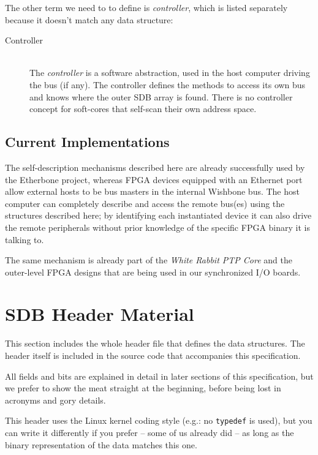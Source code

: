 \documentclass[a4paper, 12pt]{article}
\begin{document}
The other term we need to to define is \textit{controller},
which is listed separately because it doesn't match any data structure:

\begin{description}
\item[Controller] \hfill \\
The \textit{controller} is a software abstraction, used in the host
computer driving the bus (if any). The controller defines the
methods to access its own bus and knows where the outer SDB
array is found.  There is no controller concept for soft-cores
that  self-scan their own address space.

\end{description}

\subsection{Current Implementations}

The self-description mechanisms described here are already
successfully used by the Etherbone project, whereas FPGA devices
equipped with an Ethernet port allow external hosts to be bus masters
in the internal Wishbone bus.  The host computer can completely
describe and access the remote bus(es) using the structures described
here; by identifying each instantiated device it can also drive the
remote peripherals without prior knowledge of the specific FPGA binary
it is talking to.

The same mechanism is already part of the \textit{White
Rabbit PTP Core} and the outer-level FPGA designs that are
being used in our synchronized I/O boards.


\section{SDB Header Material}

This section includes the whole header file that defines the data
structures. The header itself is included in the source code
that accompanies this specification.

All fields and bits are explained in detail in later sections of this
specification, but we prefer to show the meat straight at the
beginning, before being lost in acronyms and gory details.

This header uses the Linux kernel coding style (e.g.: no \texttt{typedef} is used),
but you can write it differently if you prefer -- some of us already did -- as
long as the binary representation of the data matches this one.
\end{document}
